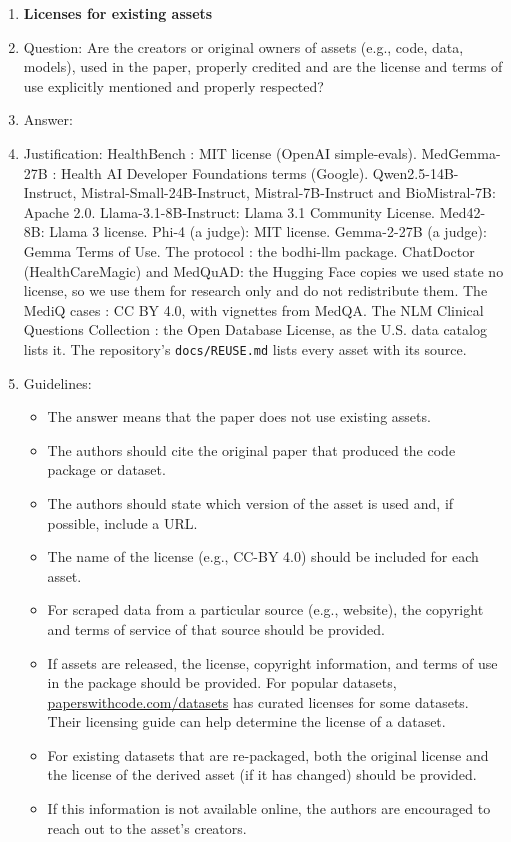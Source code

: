 \begin{enumerate}
\item {\bf Licenses for existing assets}
    \item[] Question: Are the creators or original owners of assets (e.g., code, data, models), used in the paper, properly credited and are the license and terms of use explicitly mentioned and properly respected?
    \item[] Answer: \answerYes{}
    \item[] Justification: HealthBench \citep{healthbench2025}: MIT license (OpenAI simple-evals). MedGemma-27B \citep{medgemma2025}: Health AI Developer Foundations terms (Google). Qwen2.5-14B-Instruct, Mistral-Small-24B-Instruct, Mistral-7B-Instruct and BioMistral-7B: Apache 2.0. Llama-3.1-8B-Instruct: Llama 3.1 Community License. Med42-8B: Llama 3 license. Phi-4 (a judge): MIT license. Gemma-2-27B (a judge): Gemma Terms of Use. The \bodhi{} protocol \citep{bodhi2026}: the bodhi-llm package. ChatDoctor (HealthCareMagic) and MedQuAD: the Hugging Face copies we used state no license, so we use them for research only and do not redistribute them. The MediQ cases \citep{li2024mediq}: CC BY 4.0, with vignettes from MedQA. The NLM Clinical Questions Collection \citep{nlm2026clinicalquestions}: the Open Database License, as the U.S. data catalog lists it. The repository's \texttt{docs/REUSE.md} lists every asset with its source.
    \item[] Guidelines:
    \begin{itemize}
        \item The answer \answerNA{} means that the paper does not use existing assets.
        \item The authors should cite the original paper that produced the code package or dataset.
        \item The authors should state which version of the asset is used and, if possible, include a URL.
        \item The name of the license (e.g., CC-BY 4.0) should be included for each asset.
        \item For scraped data from a particular source (e.g., website), the copyright and terms of service of that source should be provided.
        \item If assets are released, the license, copyright information, and terms of use in the package should be provided. For popular datasets, \url{paperswithcode.com/datasets} has curated licenses for some datasets. Their licensing guide can help determine the license of a dataset.
        \item For existing datasets that are re-packaged, both the original license and the license of the derived asset (if it has changed) should be provided.
        \item If this information is not available online, the authors are encouraged to reach out to the asset's creators.
    \end{itemize}


\end{enumerate}
